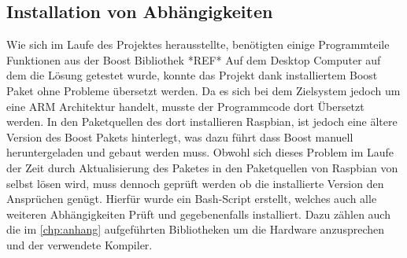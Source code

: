 \subsection{Installation von Abhängigkeiten}\label{kap:ums:abh}
Wie sich im Laufe des Projektes herausstellte, benötigten einige Programmteile Funktionen aus der Boost Bibliothek *REF* Auf dem Desktop Computer auf dem die Lösung getestet wurde, konnte das Projekt dank installiertem Boost Paket ohne Probleme übersetzt werden. Da es sich bei dem  Zielsystem jedoch um eine ARM Architektur handelt, musste der Programmcode dort Übersetzt werden. In den Paketquellen des dort installieren Raspbian, ist jedoch eine ältere Version des Boost Pakets hinterlegt, was dazu führt dass Boost manuell heruntergeladen und gebaut werden muss. Obwohl sich dieses Problem im Laufe der Zeit durch Aktualisierung des Paketes in den Paketquellen von Raspbian von selbst lösen wird, muss dennoch geprüft werden ob die installierte Version den Ansprüchen genügt. Hierfür wurde ein Bash-Script erstellt, welches auch alle weiteren Abhängigkeiten Prüft und gegebenenfalls installiert. Dazu zählen auch die im  \autoref{chp:anhang} aufgeführten Bibliotheken um die Hardware anzusprechen und der verwendete Kompiler. 

\clearpage


